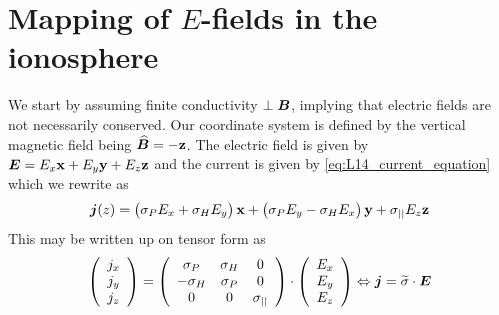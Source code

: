 \section{Mapping of \(E\)-fields in the ionosphere}
We start by assuming finite conductivity \(\perp\boldsymbol{B}\), implying that electric fields are not necessarily conserved. Our coordinate system is defined by the vertical magnetic field being \(\boldsymbol{\widehat{B}}=-\mathbf{z}\). The electric field is given by \(\boldsymbol{E}=E_x\mathbf{x}+E_y\mathbf{y}+E_z\mathbf{z}\) and the current is given by \cref{eq:L14_current_equation} which we rewrite as
\begin{equation*}
    \boldsymbol{j}(z)=\left(\sigma_{P}E_x+\sigma_{H}E_y\right)\mathbf{x}+\left(\sigma_{P}E_y-\sigma_{H}E_x\right)\mathbf{y}+\sigma_{||}E_z\mathbf{z}
\end{equation*}
This may be written up on tensor form as
\begin{equation*}
    \left(\begin{array}{c}
        j_x\\j_y\\j_z
    \end{array}\right)=\left(\begin{array}{ccc}
        \sigma_P & \sigma_H & 0\\
        -\sigma_H & \sigma_P & 0\\
        0 & 0 & \sigma_{||}
    \end{array}\right)\cdot
    \left(\begin{array}{c}
        E_x\\E_y\\E_z
    \end{array}\right)\Leftrightarrow\boldsymbol{j}=\widetilde{\sigma}\cdot\boldsymbol{E}
\end{equation*}

